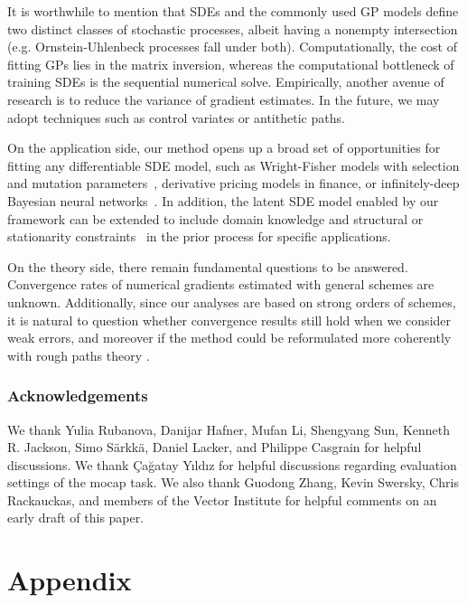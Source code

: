 \documentclass[twoside]{article}
\begin{document}
It is worthwhile to mention that SDEs and the commonly used GP models define two distinct classes of stochastic processes, albeit having a nonempty intersection (e.g. Ornstein-Uhlenbeck processes fall under both).
Computationally, the cost of fitting GPs lies in the matrix inversion, whereas the computational bottleneck of training SDEs is the sequential numerical solve. 
Empirically, another avenue of research is to reduce the variance of gradient estimates.
In the future, we may adopt techniques such as control variates or antithetic paths.


On the application side, our method opens up a broad set of opportunities for fitting any differentiable SDE model, such as Wright-Fisher models with selection and mutation parameters~\cite{ewens2012mathematical}, derivative pricing models in finance, or infinitely-deep Bayesian neural networks~\cite{neuralSDEBNN}.
In addition, the latent SDE model enabled by our framework can be extended to include domain knowledge and structural or stationarity constraints~\cite{ma2015complete} in the prior process for specific applications. 

On the theory side, there remain fundamental questions to be answered. 
Convergence rates of numerical gradients estimated with general schemes are unknown.
Additionally, since our analyses are based on strong orders of schemes, it is natural to question whether convergence results still hold when we consider weak errors, and moreover if the method could be reformulated more coherently with rough paths theory \cite{lyons1998differential}.
 
\subsubsection*{Acknowledgements}
We thank Yulia Rubanova, Danijar Hafner, Mufan Li, Shengyang Sun, Kenneth R. Jackson, Simo S\"arkk\"a, Daniel Lacker, and Philippe Casgrain for helpful discussions. 
We thank Çağatay Yıldız for helpful discussions regarding evaluation settings of the mocap task. 
We also thank Guodong Zhang, Kevin Swersky, Chris Rackauckas, and members of the Vector Institute for helpful comments on an early draft of this paper. 







\newpage
\onecolumn
\section{Appendix}
\end{document}

